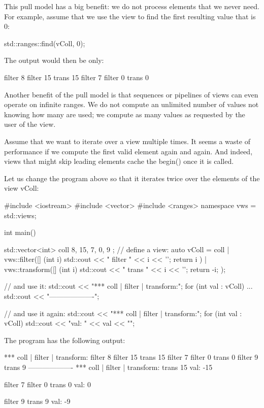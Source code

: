 This pull model has a big benefit: we do not process elements that we never need. For example, assume that we use the view to find the first resulting value that is 0:

\begin{cpp}
std::ranges::find(vColl, 0);
\end{cpp}

The output would then be only:

\begin{shell}
filter 8
filter 15
trans 15
filter 7
filter 0
trans 0
\end{shell}

Another benefit of the pull model is that sequences or pipelines of views can even operate on infinite ranges. We do not compute an unlimited number of values not knowing how many are used; we compute as many values as requested by the user of the view.


Assume that we want to iterate over a view multiple times. It seems a waste of performance if we compute the first valid element again and again. And indeed, views that might skip leading elements cache the begin() once it is called.

Let us change the program above so that it iterates twice over the elements of the view vColl:


\begin{cpp}
#include <iostream>
#include <vector>
#include <ranges>
namespace vws = std::views;

int main()
{
	std::vector<int> coll{ 8, 15, 7, 0, 9 };
	// define a view:
	auto vColl = coll
	| vws::filter([] (int i) {
		std::cout << " filter " << i << '\n';
		return i %
	})
	| vws::transform([] (int i) {
		std::cout << " trans " << i << '\n';
		return -i;
	});
	
	// and use it:
	std::cout << "*** coll | filter | transform:\n";
	for (int val : vColl) {
		...
	}
	std::cout << "-------------------\n";
	
	// and use it again:
	std::cout << "*** coll | filter | transform:\n";
	for (int val : vColl) {
		std::cout << "val: " << val << "\n\n";
	}
}
\end{cpp}

The program has the following output:

\begin{shell}
*** coll | filter | transform:
filter 8
filter 15
trans 15
filter 7
filter 0
trans 0
filter 9
trans 9
-------------------
*** coll | filter | transform:
trans 15
val: -15

filter 7
filter 0
trans 0
val: 0

filter 9
trans 9
val: -9
\end{shell}

